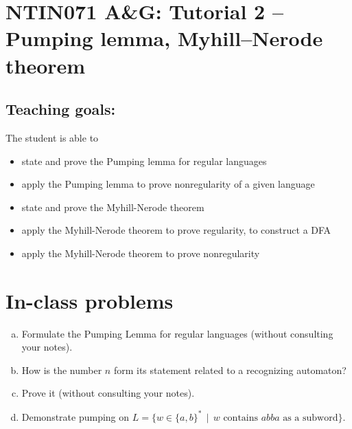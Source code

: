 \documentclass[a4paper,12pt]{amsart}
\begin{document}
\thispagestyle{empty}

\section*{NTIN071 A\&G: Tutorial 2 -- Pumping lemma, Myhill--Nerode theorem}

\medskip

\subsection*{Teaching goals:} The student is able to

    \begin{itemize}\setlength{\itemsep}{0pt}
        \item state and prove the Pumping lemma for regular languages
        \item apply the Pumping lemma to prove nonregularity of a given language
        \item state and prove the Myhill-Nerode theorem
        \item apply the Myhill-Nerode theorem to prove regularity, to construct a DFA
        \item apply the Myhill-Nerode theorem to prove nonregularity
    \end{itemize}

\section*{In-class problems}


\medskip\begin{problem}
    
    \begin{enumerate}[(a)]\setlength\itemsep{6pt}
        \item Formulate the Pumping Lemma for regular languages (without consulting your notes).
        \item How is the number $n$ form its statement related to a recognizing automaton?
        \item Prove it (without consulting your notes).
        \item Demonstrate pumping on $L=\{w\in\{a,b\}^* \,\mid\,\text{$w$ contains $abba$ as a subword}\}$.
    \end{enumerate}

\end{problem}
    
\end{document}
